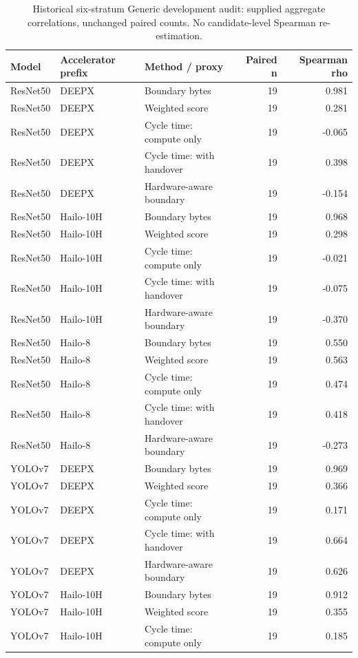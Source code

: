 \begin{longtable}{@{}llp{5.3cm}rr@{}}
\caption{Historical six-stratum Generic development audit: supplied aggregate correlations, unchanged paired counts. No candidate-level Spearman re-estimation.}\\
\toprule
Model & Accelerator prefix & Method / proxy & Paired n & Spearman rho \\
\midrule\endhead
ResNet50 & DEEPX & Boundary bytes & 19 & 0.981 \\
ResNet50 & DEEPX & Weighted score & 19 & 0.281 \\
ResNet50 & DEEPX & Cycle time: compute only & 19 & -0.065 \\
ResNet50 & DEEPX & Cycle time: with handover & 19 & 0.398 \\
ResNet50 & DEEPX & Hardware-aware boundary & 19 & -0.154 \\
ResNet50 & Hailo-10H & Boundary bytes & 19 & 0.968 \\
ResNet50 & Hailo-10H & Weighted score & 19 & 0.298 \\
ResNet50 & Hailo-10H & Cycle time: compute only & 19 & -0.021 \\
ResNet50 & Hailo-10H & Cycle time: with handover & 19 & -0.075 \\
ResNet50 & Hailo-10H & Hardware-aware boundary & 19 & -0.370 \\
ResNet50 & Hailo-8 & Boundary bytes & 19 & 0.550 \\
ResNet50 & Hailo-8 & Weighted score & 19 & 0.563 \\
ResNet50 & Hailo-8 & Cycle time: compute only & 19 & 0.474 \\
ResNet50 & Hailo-8 & Cycle time: with handover & 19 & 0.418 \\
ResNet50 & Hailo-8 & Hardware-aware boundary & 19 & -0.273 \\
YOLOv7 & DEEPX & Boundary bytes & 19 & 0.969 \\
YOLOv7 & DEEPX & Weighted score & 19 & 0.366 \\
YOLOv7 & DEEPX & Cycle time: compute only & 19 & 0.171 \\
YOLOv7 & DEEPX & Cycle time: with handover & 19 & 0.664 \\
YOLOv7 & DEEPX & Hardware-aware boundary & 19 & 0.626 \\
YOLOv7 & Hailo-10H & Boundary bytes & 19 & 0.912 \\
YOLOv7 & Hailo-10H & Weighted score & 19 & 0.355 \\
YOLOv7 & Hailo-10H & Cycle time: compute only & 19 & 0.185 \\

\end{longtable}
